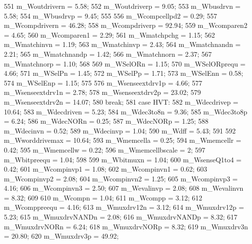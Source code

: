 \begin{DoxyCode}
{{{551                 m_Woutdrivern = 5.58;
552                 m_Woutdriverp = 9.05;
553                 m_Wbusdrvn = 5.58;
554                 m_Wbusdrvp = 9.45;
555 
556                 m_Wcompcellpd2 = 0.29;
557                 m_Wcompdrivern = 46.28;
558                 m_Wcompdriverp = 92.94;
559                 m_Wcomparen2 = 4.65;
560                 m_Wcomparen1 = 2.29;
561                 m_Wmatchpchg = 1.15;
562                 m_Wmatchinvn = 1.19;
563                 m_Wmatchinvp = 2.43;
564                 m_Wmatchnandn = 2.21;
565                 m_Wmatchnandp = 1.42;
566                 m_Wmatchnorn = 2.37;
567                 m_Wmatchnorp = 1.10;
568 
569                 m_WSelORn = 1.15;
570                 m_WSelORprequ = 4.66;
571                 m_WSelPn = 1.45;
572                 m_WSelPp = 1.71;
573                 m_WSelEnn = 0.58;
574                 m_WSelEnp = 1.15;
575 
576                 m_Wsenseextdrv1p = 4.66;
577                 m_Wsenseextdrv1n = 2.78;
578                 m_Wsenseextdrv2p = 23.02;
579                 m_Wsenseextdrv2n = 14.07;
580                 break;
581             case HVT:
582                 m_Wdecdrivep = 10.64;
583                 m_Wdecdriven = 5.23;
584                 m_Wdec3to8n = 9.36;
585                 m_Wdec3to8p = 6.24;
586                 m_WdecNORn = 0.25;
587                 m_WdecNORp = 1.25;
588                 m_Wdecinvn = 0.52;
589                 m_Wdecinvp = 1.04;
590                 m_Wdff = 5.43;
591 
592                 m_Wworddrivemax = 10.64;
593                 m_Wmemcella = 0.25;
594                 m_Wmemcellr = 0.42;
595                 m_Wmemcellw = 0.22;
596                 m_Wmemcellbscale = 2;
597                 m_Wbitpreequ = 1.04;
598 
599                 m_Wbitmuxn = 1.04;
600                 m_WsenseQ1to4 = 0.42;
601                 m_Wcompinvp1 = 1.08;
602                 m_Wcompinvn1 = 0.62;
603                 m_Wcompinvp2 = 2.08;
604                 m_Wcompinvn2 = 1.25;
605                 m_Wcompinvp3 = 4.16;
606                 m_Wcompinvn3 = 2.50;
607                 m_Wevalinvp = 2.08;
608                 m_Wevalinvn = 8.32;
609 
610                 m_Wcompn = 1.04;
611                 m_Wcompp = 3.12;
612                 m_Wcomppreequ = 4.16;
613                 m_Wmuxdrv12n = 3.12;
614                 m_Wmuxdrv12p = 5.23;
615                 m_WmuxdrvNANDn = 2.08;
616                 m_WmuxdrvNANDp = 8.32;
617                 m_WmuxdrvNORn = 6.24;
618                 m_WmuxdrvNORp = 8.32;
619                 m_Wmuxdrv3n = 20.80;
620                 m_Wmuxdrv3p = 49.92;
}}}
\end{DoxyCode}
